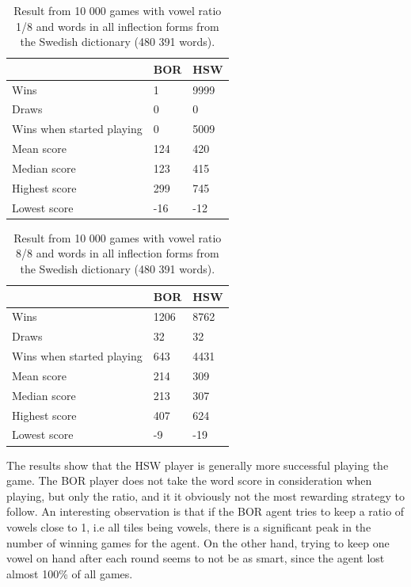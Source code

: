 \documentclass[a4paper, 12pt]{report}
\begin{document}
\begin{table}[h]
\centering
    \begin{tabular}{ l | l | l }
   	& BOR & HSW \\
   	\hline
   	Wins & 1 & 9999 \\
	Draws & 0 & 0 \\
	Wins when started playing & 0 & 5009 \\   	
	Mean score & 124 & 420 \\
	Median score & 123 & 415 \\	 	 
	Highest score & 299 & 745 \\
	Lowest score & -16 & -12 \\		
    \end{tabular}
\caption{Result from 10 000 games with vowel ratio 1/8 and words in all inflection forms from the Swedish dictionary (480 391 words).}
\label{table:borhswstats}
\end{table}

\begin{table}[h]
\centering
    \begin{tabular}{ l | l | l }
   	& BOR & HSW \\
   	\hline
   	Wins & 1206 & 8762 \\
	Draws & 32 & 32 \\
	Wins when started playing & 643 & 4431 \\   	
	Mean score & 214 & 309 \\
	Median score & 213 & 307 \\	 	 
	Highest score & 407 & 624 \\
	Lowest score & -9 & -19 \\		
    \end{tabular}
\caption{Result from 10 000 games with vowel ratio 8/8 and words in all inflection forms from the Swedish dictionary (480 391 words).}
\label{table:borhswstats}
\end{table}

The results show that the HSW player is generally more successful playing the game. The BOR player does not take the word score in consideration when playing, but only the ratio, and it it obviously not the most rewarding strategy to follow. An interesting observation is that if the BOR agent tries to keep a ratio of vowels close to 1, i.e all tiles being vowels, there is a significant peak in the number of winning games for the agent. On the other hand, trying to keep one vowel on hand after each round seems to not be as smart, since the agent lost almost 100\% of all games.
\end{document}
